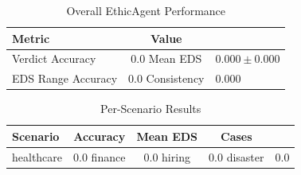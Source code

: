 
\begin{table}[htbp]
\centering
\caption{Overall EthicAgent Performance}
\label{tab:main_results}
\begin{tabular}{lc}
\toprule
\textbf{Metric} & \textbf{Value} \\
\midrule
Verdict Accuracy & 0.0%
Mean EDS & $0.000 \pm 0.000$ \\
EDS Range Accuracy & 0.0%
Consistency & 0.000 \\
\bottomrule
\end{tabular}
\end{table}

\begin{table}[htbp]
\centering
\caption{Per-Scenario Results}
\label{tab:scenario_results}
\begin{tabular}{lccc}
\toprule
\textbf{Scenario} & \textbf{Accuracy} & \textbf{Mean EDS} & \textbf{Cases} \\
\midrule
healthcare & 0.0%
finance & 0.0%
hiring & 0.0%
disaster & 0.0%
\bottomrule
\end{tabular}
\end{table}




